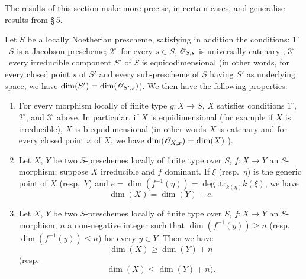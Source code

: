The results of this section make more precise, in certain cases, and generalise results from \S\,5.

\begin{proposition}[10.6.1]
\label{IV.10.6.1}
Let $S$ be a locally Noetherian prescheme, satisfying in addition the conditions: $1^\circ$~$S$ is a Jacobson prescheme; $2^\circ$~for every $s\in S$, $\mathscr{O}_{S,s}$ is universally catenary ; $3^\circ$~every irreducible component $S'$ of $S$ is equicodimensional (in other words, for every closed point $s$ of $S'$ and every sub-prescheme of $S$ having $S'$ as underlying space, we have $\dim(S')=\dim(\mathscr{O}_{S',s})$).
We then have the following properties:
\begin{enumerate}[label=(\roman*)]
  \item For every morphism locally of finite type $g:X\to S$, $X$ satisfies conditions $1^\circ$, $2^\circ$, and $3^\circ$ above.
In particular, if $X$ is equidimensional (for example if $X$ is irreducible), $X$ is biequidimensional (in other words $X$ is catenary and for every closed point $x$ of $X$, we have $\dim(\mathscr{O}_{X,x})=\dim(X)$ ).
  \item Let $X$, $Y$ be two $S$-preschemes locally of finite type over $S$, $f:X\to Y$ an $S$-morphism; suppose $X$ irreducible and $f$ dominant.
If $\xi$ (resp.\ $\eta$) is the generic point of $X$ (resp.\ $Y$) and $e=\dim(f^{-1}(\eta))=\deg.\mathrm{tr}_{k(\eta)}k(\xi)$, we have
\begin{equation}
\label{IV.10.6.1.1}
\tag{10.6.1.1}
\dim(X)=\dim(Y)+e.
\end{equation}
  \item Let $X$, $Y$ be two $S$-preschemes locally of finite type over $S$, $f:X\to Y$ an $S$-morphism, $n$ a non-negative integer such that $\dim(f^{-1}(y))\geq n$ (resp.\ $\dim(f^{-1}(y))\leq n$) for every $y\in Y$.
Then we have
\begin{equation}
\label{IV.10.6.1.2}
\tag{10.6.1.2}
\dim(X)\geq\dim(Y)+n
\end{equation}
(resp.
\begin{equation}
\label{IV.10.6.1.3}
\tag{10.6.1.3}
\dim(X)\leq\dim(Y)+n).
\end{equation}
\end{enumerate}
\end{proposition}


